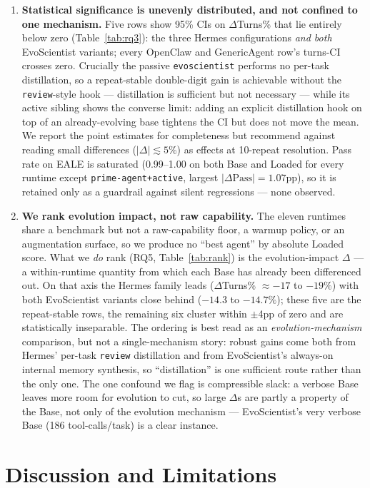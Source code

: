 \documentclass{article}
\begin{document}
\begin{enumerate}
\item \textbf{Statistical significance is unevenly distributed, and not confined to one mechanism.} Five rows show 95\% CIs on $\Delta$Turns\% that lie entirely below zero (Table~\ref{tab:rq3}): the three Hermes configurations \emph{and both} EvoScientist variants; every OpenClaw and GenericAgent row's turns-CI crosses zero. Crucially the passive \texttt{evoscientist} performs no per-task distillation, so a repeat-stable double-digit gain is achievable without the \texttt{review}-style hook --- distillation is sufficient but not necessary --- while its active sibling shows the converse limit: adding an explicit distillation hook on top of an already-evolving base tightens the CI but does not move the mean. We report the point estimates for completeness but recommend against reading small differences ($|\Delta| \lesssim 5\%$) as effects at 10-repeat resolution. Pass rate on EALE is saturated (0.99--1.00 on both Base and Loaded for every runtime except \texttt{prime-agent+active}, largest $|\Delta\text{Pass}| = 1.07$pp), so it is retained only as a guardrail against silent regressions --- none observed.
\item \textbf{We rank evolution impact, not raw capability.} The eleven runtimes share a benchmark but not a raw-capability floor, a warmup policy, or an augmentation surface, so we produce no ``best agent'' by absolute Loaded score. What we \emph{do} rank (RQ5, Table~\ref{tab:rank}) is the evolution-impact $\Delta$ --- a within-runtime quantity from which each Base has already been differenced out. On that axis the Hermes family leads ($\Delta$Turns\% $\approx-17$ to $-19\%$) with both EvoScientist variants close behind ($-14.3$ to $-14.7\%$); these five are the repeat-stable rows, the remaining six cluster within $\pm$4pp of zero and are statistically inseparable. The ordering is best read as an \emph{evolution-mechanism} comparison, but not a single-mechanism story: robust gains come both from Hermes' per-task \texttt{review} distillation and from EvoScientist's always-on internal memory synthesis, so ``distillation'' is one sufficient route rather than the only one. The one confound we flag is compressible slack: a verbose Base leaves more room for evolution to cut, so large $\Delta$s are partly a property of the Base, not only of the evolution mechanism --- EvoScientist's very verbose Base (186 tool-calls/task) is a clear instance.
\end{enumerate}


\section{Discussion and Limitations}
\end{document}
